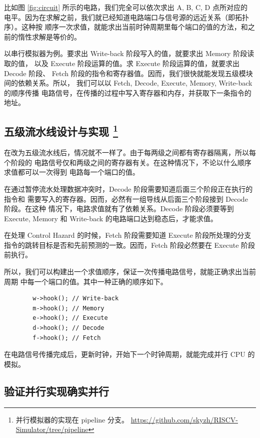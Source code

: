 \documentclass[12pt]{article}
\begin{document}
    比如图 \ref{fig:circuit} 所示的电路，我们完全可以依次求出 A, B, C, D 点所对应的
    电平。因为在求解之前，我们就已经知道电路端口与信号源的远近关系（即拓扑序）。这种按
    顺序一次求值，就能求出当前时钟周期里每个端口的值的方法，和之前的惰性求解是等价的。

    以串行模拟器为例。要求出 Write-back 阶段写入的值，就要求出 Memory 阶段读取的值，
    以及 Execute 阶段运算的值。求 Execute 阶段运算的值，就要求出 Decode 阶段、
    Fetch 阶段的指令和寄存器值。因而，我们很快就能发现五级模块间的依赖关系。所以，
    我们可以以 Fetch, Decode, Execute, Memory, Write-back 的顺序传播
    电路信号，在传播的过程中写入寄存器和内存，并获取下一条指令的地址。

    \subsection{五级流水线设计与实现\protect
    \footnote{并行模拟器的实现在 pipeline 分支。
    \url{https://github.com/skyzh/RISCV-Simulator/tree/pipeline}}}

    在改为五级流水线后，情况就不一样了。由于每两级之间都有寄存器隔离，所以每个阶段的
    电路信号仅和两级之间的寄存器有关。在这种情况下，不论以什么顺序求值都可以一次得到
    电路每一个端口的值。

    在通过暂停流水处理数据冲突时，Decode 阶段需要知道后面三个阶段正在执行的指令和
    需要写入的寄存器。因而，必然有一组导线从后面三个阶段接到 Decode 阶段。在这种
    情况下，电路求值就有了依赖关系。Decode 阶段必须要等到 Execute, Memory
    和 Write-back 的电路端口达到稳态后，才能求值。

    在处理 Control Hazard 的时候，Fetch 阶段需要知道 Execute 阶段所处理的分支
    指令的跳转目标是否和先前预测的一致。因而，Fetch 阶段必然要在 Execute 阶段前执行。

    所以，我们可以构建出一个求值顺序，保证一次传播电路信号，就能正确求出当前周期
    中每一个端口的值。其中一种正确的顺序如下。

    \begin{verbatim}
        w->hook(); // Write-back
        m->hook(); // Memory
        e->hook(); // Execute
        d->hook(); // Decode
        f->hook(); // Fetch
    \end{verbatim}

    在电路信号传播完成后，更新时钟，开始下一个时钟周期，就能完成并行 CPU 的模拟。

    \subsection{验证并行实现确实并行}
\end{document}
